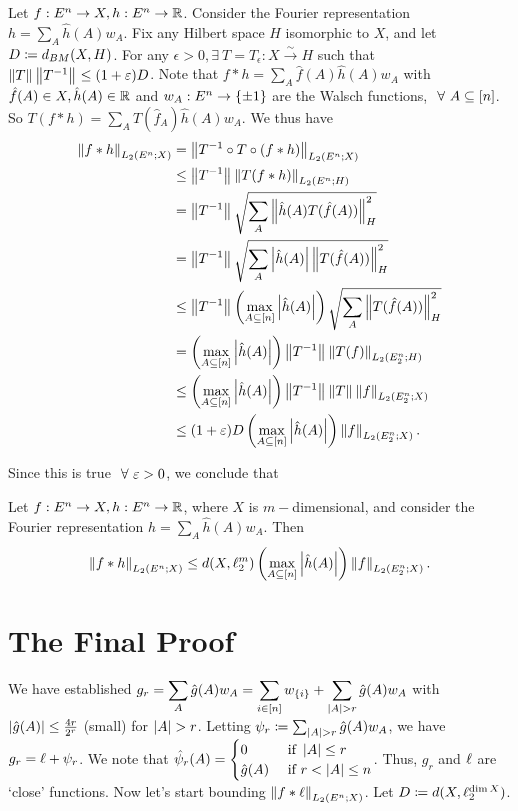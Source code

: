 Let $f:E^{n}\to X, h:E^{n}\to \mathbb{R}$. Consider the Fourier representation $h = \sum_{A} \hat h(A) w_{A}$. Fix any Hilbert space $H$ isomorphic to $X$, and let $D \coloneqq d_{BM}(X,H)$. For any $\epsilon>0, \exists ~ T = T_{\epsilon} : X\stackrel{\sim}{\to}H$ such that $\left\lVert T \right\rVert_{}\left\lVert T^{-1} \right\rVert_{} \le (1+\varepsilon)D$. Note that $f\ast h = \sum_{A} \hat f(A) \hat h(A) w_{A}$ with $\hat f(A)\in X, \hat h(A)\in \mathbb{R}$ and $w_{A}:E^{n}\to \left\{\pm 1\right\}$ are the Walsch functions, $~\forall~ A\subseteq [n]$. So $T(f\ast h) = \sum_{A} T(\hat f_{A})\hat h(A)w_{A}$. We thus have
\begin{align*}
\left\lVert f\ast h \right\rVert_{L_{2}(E^{n};X)} &= \left\lVert T^{-1}\circ T\circ (f\ast h) \right\rVert_{L_{2}(E^{n};X)}\\
&\le \left\lVert T^{-1} \right\rVert_{}\left\lVert T(f\ast h) \right\rVert_{L_{2}(E^{n};H)}\\
&= \left\lVert T^{-1} \right\rVert_{} \sqrt{\sum_{A} \left\lVert \hat h(A) T(\hat f(A)) \right\rVert_{H}^{2}}\\
&= \left\lVert T^{-1} \right\rVert_{} \sqrt{\sum_{A} \left| \hat h(A) \right|\left\lVert  T(\hat f(A)) \right\rVert_{H}^{2}}\\
&\le \left\lVert T^{-1} \right\rVert_{}\left(\max_{A\subseteq[n]}\left| \hat h(A) \right| \right) \sqrt{\sum_{A} \left\lVert  T(\hat f(A)) \right\rVert_{H}^{2}}\\
&= \left(\max_{A\subseteq[n]}\left| \hat h(A) \right| \right)\left\lVert T^{-1} \right\rVert_{} \left\lVert T(f) \right\rVert_{L_{2}(E_{2}^{n};H)}\\
&\le \left(\max_{A\subseteq[n]}\left| \hat h(A) \right| \right)\left\lVert T^{-1} \right\rVert_{} \left\lVert T \right\rVert_{}\left\lVert f \right\rVert_{L_{2}(E_{2}^{n};X)}\\
&\le (1+\varepsilon)D\left(\max_{A\subseteq[n]}\left| \hat h(A) \right| \right)\left\lVert f \right\rVert_{L_{2}(E_{2}^{n};X)}.
\end{align*}

Since this is true $~\forall~ \varepsilon>0$, we conclude that 
\begin{lemma}\label{lem:fourierbound}
Let $f:E^{n}\to X, h:E^{n}\to \mathbb{R}$, where $X$ is $m-$dimensional, and consider the Fourier representation $h = \sum_{A} \hat h(A) w_{A}$. Then $$\left\lVert f\ast h \right\rVert_{L_{2}(E^{n};X)} \le d(X,\ell_{2}^{m})\left(\max_{A\subseteq[n]}\left| \hat h(A) \right| \right)\left\lVert f \right\rVert_{L_{2}(E_{2}^{n};X)}.$$
\end{lemma}


\section{The Final Proof}

We have established $\displaystyle g_{r} = \sum_{A}\hat g(A)w_{A} = \sum_{i\in[n]} w_{\left\{i\right\}} + \sum_{\left| A \right| > r} \hat g(A) w_{A}$ with $\left| \hat g(A) \right| \le \frac{4r}{2^{r}}$ (small) for $\left| A \right| > r$. Letting $\psi_{r}\coloneqq \sum_{\left| A \right| > r} \hat g(A) w_{A}$, we have $g_{r} = \ell + \psi_{r}$. We note that $\hat\psi_{r}(A) = \begin{cases}
0 & \text{ if } \left| A \right| \le r\\
\hat g(A) & \text{ if } r < \left| A \right| \le n
\end{cases}$. Thus, $g_{r}$ and $\ell$ are `close' functions. Now let's start bounding $\left\lVert f\ast \ell \right\rVert_{L_{2}(E^{n};X)}$. Let $D\coloneqq d(X,\ell_{2}^{\dim X})$.

